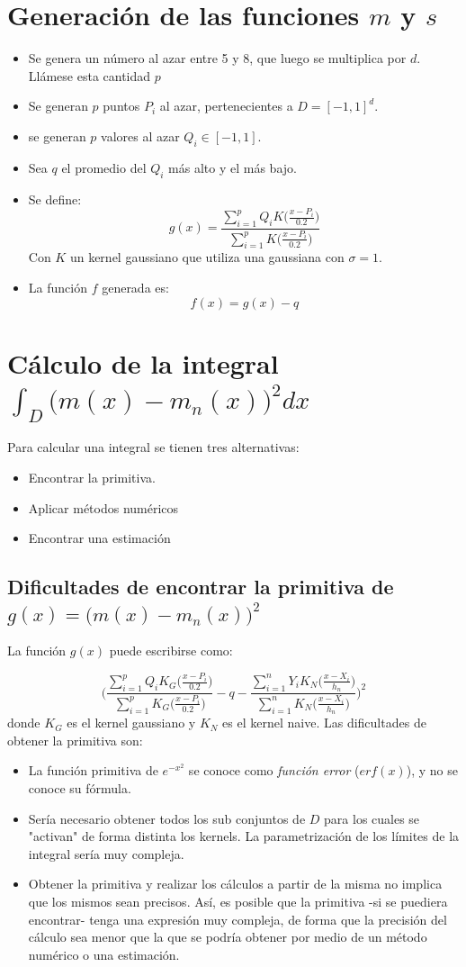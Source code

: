 \documentclass[12pt, a4paper]{article}
\begin{document}
\section{Generación de las funciones $m$ y $s$}
\begin{itemize}
    \item Se genera un número al azar entre 5 y 8, que luego se multiplica por $d$. Llámese esta cantidad $p$
    \item Se generan $p$ puntos $P_i$ al azar, pertenecientes a $D=[-1,1]^d$.
    \item se generan $p$ valores al azar $Q_i\in[-1,1]$.
    \item Sea $q$ el promedio del $Q_i$ más alto y el más bajo.
    \item Se define:
    $$
g(x)=\frac{\sum_{i=1}^{p} Q_i K \big( \frac{x-P_i}{0.2} \big)}{\sum_{i=1}^{p} K \big( \frac{x-P_i}{0.2} \big)}
    $$
    Con $K$ un kernel gaussiano que utiliza una gaussiana con $\sigma=1$.
    \item La función $f$ generada es:
    $$
    f(x)=g(x)-q
    $$
\end{itemize}

\section{Cálculo de la integral $\int_D \big(m(x)-m_n(x)\big)^2 dx$}
Para calcular una integral se tienen tres alternativas:
\begin{itemize}
    \item Encontrar la primitiva.
    \item Aplicar métodos numéricos
    \item Encontrar una estimación
\end{itemize}
\subsection{Dificultades de encontrar la primitiva de $g(x)=\big(m(x)-m_n(x)\big)^2$}
La función $g(x)$ puede escribirse como:

$$
\Bigg(\frac{\sum_{i=1}^{p} Q_i K_G \big( \frac{x-P_i}{0.2} \big)}{\sum_{i=1}^{p} K_G \big( \frac{x-P_i}{0.2} \big)}-q-\frac{\sum_{i=1}^{n} Y_i K_N \big( \frac{x-X_i}{h_n} \big)}{\sum_{i=1}^{n} K_N \big( \frac{x-X_i}{h_n} \big)}\Bigg)^2
$$
donde $K_G$ es el kernel gaussiano y $K_N$ es el kernel naive.
Las dificultades de obtener la primitiva son:
\begin{itemize}
    \item La función primitiva de $e^{-x^2}$ se conoce como \textit{función error} ($erf(x)$), y no se conoce su fórmula.
    \item Sería necesario obtener todos los sub conjuntos de $D$ para los cuales se "activan" de forma distinta los kernels. La parametrización de los límites de la integral sería muy compleja.
    \item Obtener la primitiva y realizar los cálculos a partir de la misma no implica que los mismos sean precisos. Así, es posible que la primitiva -si se puediera encontrar- tenga una expresión muy compleja, de forma que la precisión del cálculo sea menor que la que se podría obtener por medio de un método numérico o una estimación.
\end{itemize}
\end{document}
